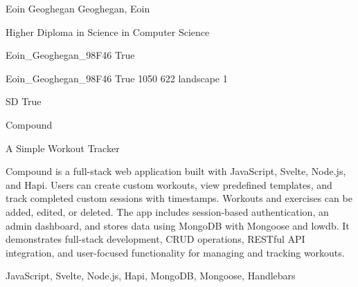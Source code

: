 
\begingroup{}\relax



\def\Key{Eoin_Geoghegan_98F46}

{Eoin Geoghegan}
{Geoghegan, Eoin}

{Higher Diploma in Science in Computer Science}

{Eoin_Geoghegan_98F46}
{True}

{Eoin_Geoghegan_98F46}
{True}
{1050}
{622}
{landscape}
{1}

{SD}
{True}

{Compound}

{A Simple Workout Tracker}

{Compound is a full-stack web application built with JavaScript, Svelte, Node.js, and Hapi. Users can create custom workouts, view predefined templates, and track completed custom sessions with timestamps. Workouts and exercises can be added, edited, or deleted. The app includes session-based authentication, an admin dashboard, and stores data using MongoDB with Mongoose and lowdb. It demonstrates full-stack development, CRUD operations, RESTful API integration, and user-focused functionality for managing and tracking workouts.}

{JavaScript, Svelte, Node.js, Hapi, MongoDB, Mongoose, Handlebars}

